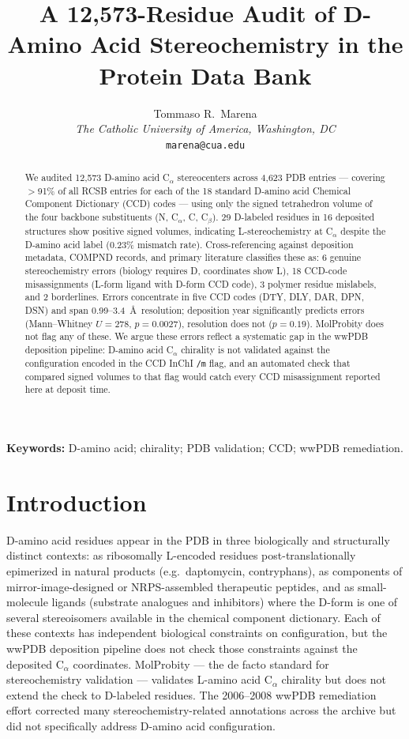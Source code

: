 \documentclass[11pt]{article}
\title{A 12{,}573-Residue Audit of D-Amino Acid Stereochemistry in the Protein Data Bank}
\author{Tommaso R.\ Marena\\
\textit{The Catholic University of America, Washington, DC}\\
\texttt{marena@cua.edu}}
\date{}
\begin{document}
\maketitle

\begin{abstract}
We audited 12{,}573 D-amino acid C$_\alpha$ stereocenters across 4{,}623 PDB entries --- covering $>$91\% of all RCSB entries for each of the 18 standard D-amino acid Chemical Component Dictionary (CCD) codes --- using only the signed tetrahedron volume of the four backbone substituents (N, C$_\alpha$, C, C$_\beta$). 29 D-labeled residues in 16 deposited structures show positive signed volumes, indicating L-stereochemistry at C$_\alpha$ despite the D-amino acid label (0.23\% mismatch rate). Cross-referencing against deposition metadata, COMPND records, and primary literature classifies these as: 6 genuine stereochemistry errors (biology requires D, coordinates show L), 18 CCD-code misassignments (L-form ligand with D-form CCD code), 3 polymer residue mislabels, and 2 borderlines. Errors concentrate in five CCD codes (DTY, DLY, DAR, DPN, DSN) and span 0.99--3.4~\AA\ resolution; deposition year significantly predicts errors (Mann--Whitney $U=278$, $p=0.0027$), resolution does not ($p=0.19$). MolProbity does not flag any of these. We argue these errors reflect a systematic gap in the wwPDB deposition pipeline: D-amino acid C$_\alpha$ chirality is not validated against the configuration encoded in the CCD InChI \texttt{/m} flag, and an automated check that compared signed volumes to that flag would catch every CCD misassignment reported here at deposit time.
\end{abstract}

\noindent\textbf{Keywords:} D-amino acid; chirality; PDB validation; CCD; wwPDB remediation.

\section{Introduction}

D-amino acid residues appear in the PDB in three biologically and structurally distinct contexts: as ribosomally L-encoded residues post-translationally epimerized in natural products (e.g.\ daptomycin, contryphans), as components of mirror-image-designed or NRPS-assembled therapeutic peptides, and as small-molecule ligands (substrate analogues and inhibitors) where the D-form is one of several stereoisomers available in the chemical component dictionary. Each of these contexts has independent biological constraints on configuration, but the wwPDB deposition pipeline does not check those constraints against the deposited C$_\alpha$ coordinates. MolProbity --- the de facto standard for stereochemistry validation \citep{chen2010,lovell2003} --- validates L-amino acid C$_\alpha$ chirality but does not extend the check to D-labeled residues. The 2006--2008 wwPDB remediation effort \citep{henrick2008} corrected many stereochemistry-related annotations across the archive but did not specifically address D-amino acid configuration.
\end{document}
